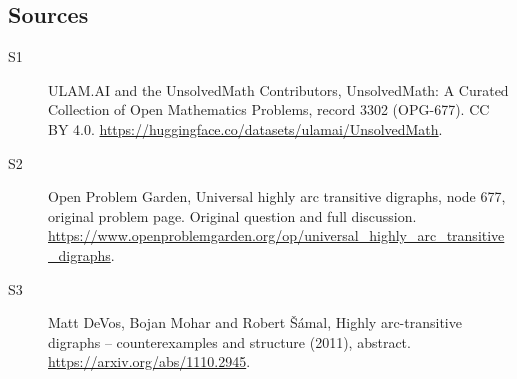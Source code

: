 \documentclass[11pt]{article}
\begin{document}
\subsection{Sources}
\begin{description}
\item[\hypertarget{source:3302:1}{S1}] ULAM.AI and the UnsolvedMath Contributors, UnsolvedMath: A Curated Collection of Open Mathematics Problems, record 3302 (OPG-677). CC BY 4.0. \url{https://huggingface.co/datasets/ulamai/UnsolvedMath}.
\item[\hypertarget{source:3302:2}{S2}] Open Problem Garden, Universal highly arc transitive digraphs, node 677, original problem page. Original question and full discussion. \url{https://www.openproblemgarden.org/op/universal_highly_arc_transitive_digraphs}.
\item[\hypertarget{source:3302:3}{S3}] Matt DeVos, Bojan Mohar and Robert Šámal, Highly arc-transitive digraphs -- counterexamples and structure (2011), abstract. \url{https://arxiv.org/abs/1110.2945}.
\end{description}
\label{end:3302}
\end{document}
